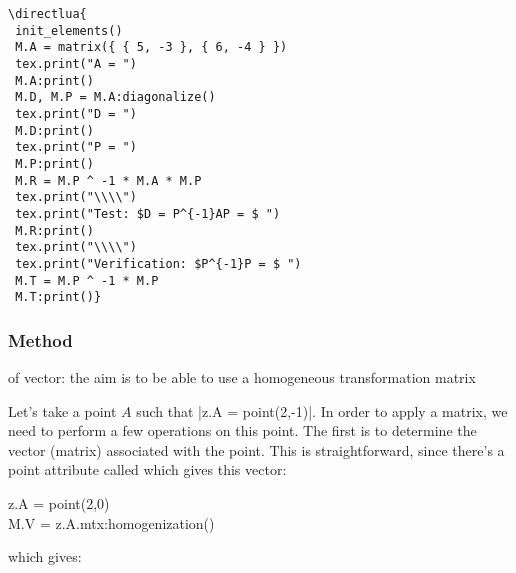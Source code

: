 \begin{minipage}{.5\textwidth}
\begin{verbatim}
\directlua{
 init_elements()
 M.A = matrix({ { 5, -3 }, { 6, -4 } })
 tex.print("A = ")
 M.A:print()
 M.D, M.P = M.A:diagonalize()
 tex.print("D = ")
 M.D:print()
 tex.print("P = ")
 M.P:print()
 M.R = M.P ^ -1 * M.A * M.P
 tex.print("\\\\")
 tex.print("Test: $D = P^{-1}AP = $ ")
 M.R:print()
 tex.print("\\\\")
 tex.print("Verification: $P^{-1}P = $ ")
 M.T = M.P ^ -1 * M.P
 M.T:print()}
\end{verbatim}
\end{minipage}
\begin{minipage}{.5\textwidth}
\end{minipage}

\subsubsection{Method } %
\label{ssub:method_homogenization}

 of vector: the aim is to be able to use a homogeneous transformation matrix

Let's take a point $A$ such that |z.A = point(2,-1)|. In order to apply a   matrix, we need to perform a few operations on this point. The first is to determine the vector (matrix) associated with the point. This is straightforward, since there's a point attribute called  which gives this vector:

\begin{mybox}
z.A = point(2,0)\\
M.V = z.A.mtx:homogenization()
\end{mybox}
which gives:

